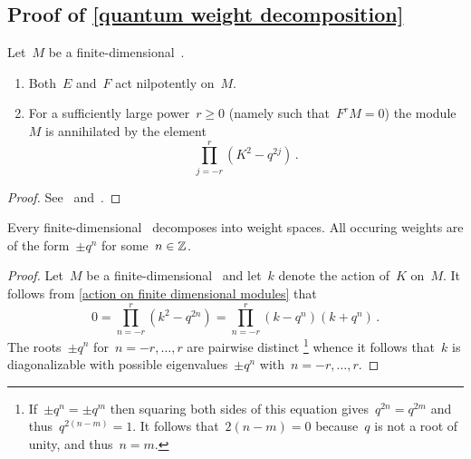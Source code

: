 \documentclass[a4paper, 11pt, oneside]{scrartcl}
\begin{document}



\subsection{Proof of \cref{quantum weight decomposition}}
\label{proof of quantum weight decomposition}

\begin{lemma}
  \label{action on finite dimensional modules}
  Let~$M$ be a finite-dimensional~.
  \begin{enumerate}
    \item
      Both~$E$ and~$F$ act nilpotently on~$M$.
    \item
      For a sufficiently large power~$r \geq 0$ (namely such that~$F^r M = 0$) the module~$M$ is annihilated by the element
      \[
        \prod_{j = -r}^r (K^2 - q^{2j}) \,.
      \]
  \end{enumerate}
\end{lemma}

\begin{proof}
  See~\cite[Proposition~2.1]{jantzen_quantum} and~\cite[Proposition~2.3]{jantzen_quantum}.
\end{proof}

\begin{proposition}
  Every finite-dimensional~ decomposes into weight spaces.
  All occuring weights are of the form~$\pm q^n$ for some~$n \in \mathbb{Z}$.
\end{proposition}

\begin{proof}
  Let~$M$ be a finite-dimensional~ and let~$k$ denote the action of~$K$ on~$M$.
  It follows from \cref{action on finite dimensional modules} that
  \[
    0
    =
    \prod_{n = -r}^r ( k^2 - q^{2n} )
    =
    \prod_{n = -r}^r ( k - q^n ) ( k + q^n ) \,.
  \]
  The roots~$\pm q^n$ for~$n = -r, \dotsc, r$ are pairwise distinct%
  \footnote{
    If~$\pm q^n = \pm q^m$ then squaring both sides of this equation gives~$q^{2n} = q^{2m}$ and thus~$q^{2(n-m)} = 1$.
    It follows that~$2(n-m) = 0$ because~$q$ is not a root of unity, and thus~$n = m$.
  }
  whence it follows that~$k$ is diagonalizable with possible eigenvalues~$\pm q^n$ with~$n = -r, \dotsc, r$.
\end{proof}
\end{document}

